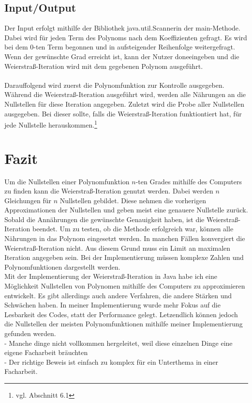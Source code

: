 \documentclass[12pt]{article}
\begin{document}
\subsection{Input/Output}
Der Input erfolgt mithilfe der Bibliothek \glqq java.util.Scanner\grqq\space in der \glqq main\grqq-Methode. Dabei wird für jeden Term des Polynoms nach dem Koeffizienten gefragt. Es wird bei dem $0$-ten Term begonnen und in aufsteigender Reihenfolge weitergefragt. Wenn der gewünschte Grad erreicht ist, kann der Nutzer \glqq done\grqq\space eingeben und die Weierstraß-Iteration wird mit dem gegebenen Polynom ausgeführt.\\
\\
Darauffolgend wird zuerst die Polynomfunktion zur Kontrolle ausgegeben. Während die Weierstraß-Iteration ausgeführt wird, werden alle Nährungen an die Nullstellen für diese Iteration angegeben. Zuletzt wird die Probe aller Nullstellen ausgegeben. Bei dieser sollte, falls die Weierstraß-Iteration funktiontiert hat, \grqq\space für jede Nullstelle herauskommen.\footnote{
    vgl. Abschnitt 6.1
}

\section{Fazit}
Um die Nullstellen einer Polynomfunktion $n$-ten Grades mithilfe des Computers zu finden kann die Weierstraß-Iteration genutzt werden. Dabei werden $n$ Gleichungen für $n$ Nullstellen gebildet. Diese nehmen die vorherigen Approximationen der Nullstellen und geben meist eine genauere Nullstelle zurück. Sobald die Annährungen die gewünschte Genauigkeit haben, ist die Weierstraß-Iteration beendet. Um zu testen, ob die Methode erfolgreich war, können alle Nährungen in das Polynom eingesetzt werden. In manchen Fällen konvergiert die Weierstraß-Iteration nicht. Aus diesem Grund muss ein Limit an maximalen Iteration angegeben sein. Bei der Implementierung müssen komplexe Zahlen und Polynomfunktionen dargestellt werden. %
\\
Mit der Implementierung der Weierstraß-Iteration in Java habe ich eine Möglichkeit Nullstellen von Polynomen mithilfe des Computers zu approximieren entwickelt. Es gibt allerdings auch andere Verfahren, die andere Stärken und Schwächen haben. In meiner Implementierung wurde mehr Fokus auf die Lesbarkeit des Codes, statt der Performance gelegt. Letzendlich können jedoch die Nullstellen der meisten Polynomfunktionen mithilfe meiner Implementierung gefunden werden.
\\
- Manche dinge nicht vollkommen hergeleitet, weil diese einzelnen Dinge eine eigene Facharbeit bräuchten\\
- Der richtige Beweis ist einfach zu komplex für ein Unterthema in einer Facharbeit.
\end{document}
